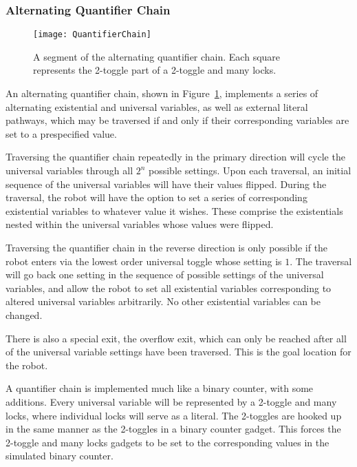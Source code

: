 \subsubsection{Alternating Quantifier Chain}
\begin{figure}[h!]
\centering
    \texttt{[image: QuantifierChain]}
    \caption{A segment of the alternating quantifier chain. Each square represents the 2-toggle part of a 2-toggle and many locks.}
    \label{fig:QuantifierChain}
\end{figure}

An alternating quantifier chain, shown in Figure~\ref{fig:QuantifierChain}, implements a series of
alternating existential and universal variables, as well as external literal pathways, which may be traversed
if and only if their corresponding variables are set to a prespecified value.

Traversing the quantifier chain
repeatedly in the primary direction will cycle the universal variables through all $2^n$ possible settings.
Upon each traversal, an initial sequence of the universal variables will have their values flipped.
During the traversal, the robot will have the option to set a series of corresponding existential variables to whatever value it wishes. These comprise the existentials nested within the universal variables whose values were flipped.

Traversing  the quantifier chain in the reverse direction is only possible if the robot enters
via the lowest order universal toggle whose setting is $1$. The traversal will go back one setting in the
sequence of possible settings of the universal variables, and allow the robot to set all existential variables
corresponding to altered universal variables arbitrarily. No other existential variables can be changed.

There is also a special exit, the overflow exit, which can only be
reached after all of the universal variable settings have been traversed. This is the goal location for the robot.

A quantifier chain is implemented much like a binary counter, with some additions. Every universal variable will be represented by a 2-toggle and many locks, where individual locks will serve as a literal. The 2-toggles are hooked up in the same manner as the 2-toggles in a binary counter gadget. This forces the 2-toggle and many locks gadgets to be set to the corresponding values in the simulated binary counter.

